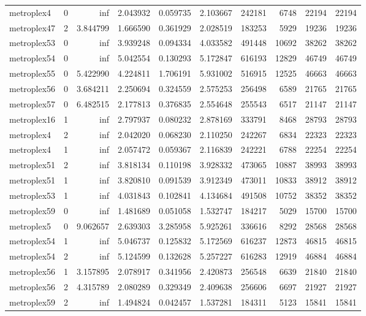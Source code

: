 \documentclass[../../../thesis.tex]{subfiles}
\begin{document}
\begin{longtable}{|l|r|r|r|r|r|r|r|r|r|}
metroplex4 & 0 & inf & 2.043932 & 0.059735 & 2.103667 & 242181 & 6748 & 22194 & 22194 \\
metroplex47 & 2 & 3.844799 & 1.666590 & 0.361929 & 2.028519 & 183253 & 5929 & 19236 & 19236 \\
metroplex53 & 0 & inf & 3.939248 & 0.094334 & 4.033582 & 491448 & 10692 & 38262 & 38262 \\
metroplex54 & 0 & inf & 5.042554 & 0.130293 & 5.172847 & 616193 & 12829 & 46749 & 46749 \\
metroplex55 & 0 & 5.422990 & 4.224811 & 1.706191 & 5.931002 & 516915 & 12525 & 46663 & 46663 \\
metroplex56 & 0 & 3.684211 & 2.250694 & 0.324559 & 2.575253 & 256498 & 6589 & 21765 & 21765 \\
metroplex57 & 0 & 6.482515 & 2.177813 & 0.376835 & 2.554648 & 255543 & 6517 & 21147 & 21147 \\
metroplex16 & 1 & inf & 2.797937 & 0.080232 & 2.878169 & 333791 & 8468 & 28793 & 28793 \\
metroplex4 & 2 & inf & 2.042020 & 0.068230 & 2.110250 & 242267 & 6834 & 22323 & 22323 \\
metroplex4 & 1 & inf & 2.057472 & 0.059367 & 2.116839 & 242221 & 6788 & 22254 & 22254 \\
metroplex51 & 2 & inf & 3.818134 & 0.110198 & 3.928332 & 473065 & 10887 & 38993 & 38993 \\
metroplex51 & 1 & inf & 3.820810 & 0.091539 & 3.912349 & 473011 & 10833 & 38912 & 38912 \\
metroplex53 & 1 & inf & 4.031843 & 0.102841 & 4.134684 & 491508 & 10752 & 38352 & 38352 \\
metroplex59 & 0 & inf & 1.481689 & 0.051058 & 1.532747 & 184217 & 5029 & 15700 & 15700 \\
metroplex5 & 0 & 9.062657 & 2.639303 & 3.285958 & 5.925261 & 336616 & 8292 & 28568 & 28568 \\
metroplex54 & 1 & inf & 5.046737 & 0.125832 & 5.172569 & 616237 & 12873 & 46815 & 46815 \\
metroplex54 & 2 & inf & 5.124599 & 0.132628 & 5.257227 & 616283 & 12919 & 46884 & 46884 \\
metroplex56 & 1 & 3.157895 & 2.078917 & 0.341956 & 2.420873 & 256548 & 6639 & 21840 & 21840 \\
metroplex56 & 2 & 4.315789 & 2.080289 & 0.329349 & 2.409638 & 256606 & 6697 & 21927 & 21927 \\
metroplex59 & 2 & inf & 1.494824 & 0.042457 & 1.537281 & 184311 & 5123 & 15841 & 15841 \\

\end{longtable}
\end{document}
